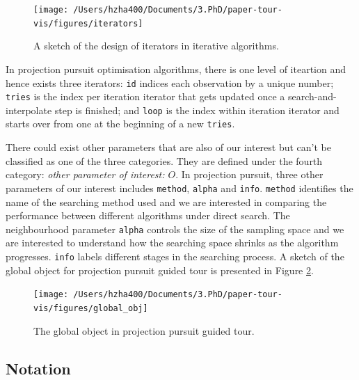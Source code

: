 \documentclass[12pt]{article}
\begin{document}
\begin{figure}
\texttt{[image: /Users/hzha400/Documents/3.PhD/paper-tour-vis/figures/iterators]} \caption{\label{iterators} A sketch of the design of iterators in iterative algorithms.}\label{fig:iterators}
\end{figure}

In projection pursuit optimisation algorithms, there is one level of
iteartion and hence exists three iterators: \texttt{id} indices each
observation by a unique number; \texttt{tries} is the index per
iteration iterator that gets updated once a search-and-interpolate step
is finished; and \texttt{loop} is the index within iteration iterator
and starts over from one at the beginning of a new \texttt{tries}.

There could exist other parameters that are also of our interest but
can't be classified as one of the three categories. They are defined
under the fourth category: \emph{other parameter of interest: \(O\)}. In
projection pursuit, three other parameters of our interest includes
\texttt{method}, \texttt{alpha} and \texttt{info}. \texttt{method}
identifies the name of the searching method used and we are interested
in comparing the performance between different algorithms under direct
search. The neighbourhood parameter \texttt{alpha} controls the size of
the sampling space and we are interested to understand how the searching
space shrinks as the algorithm progresses. \texttt{info} labels
different stages in the searching process. A sketch of the global object
for projection pursuit guided tour is presented in Figure
\ref{fig:glb-obj}.

\begin{figure}
\texttt{[image: /Users/hzha400/Documents/3.PhD/paper-tour-vis/figures/global\_obj]} \caption{\label{glb-obj}The global object in projection pursuit guided tour.}\label{fig:glb-obj}
\end{figure}

\hypertarget{notation}{%
\subsection{Notation}\label{notation}}
\end{document}
